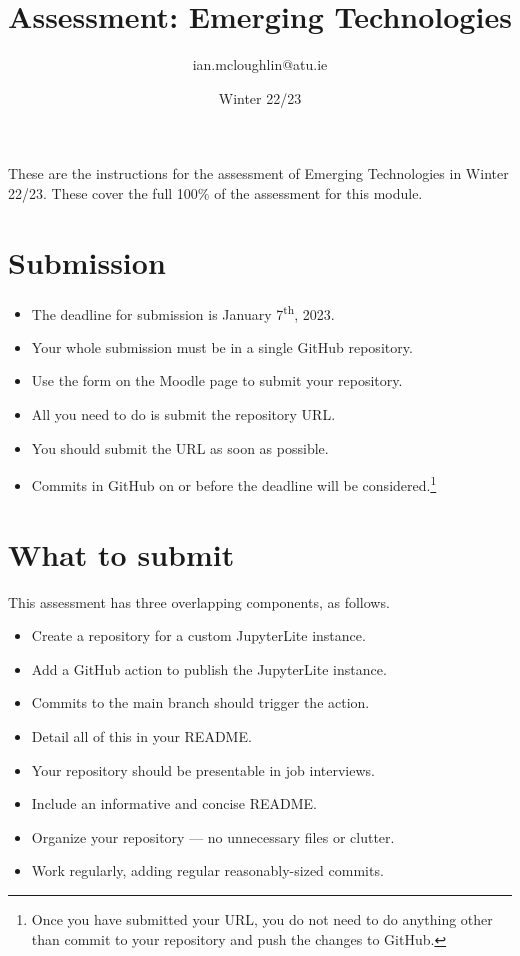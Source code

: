 \documentclass[a4paper]{tufte-handout}
\title{Assessment: Emerging Technologies}
\author{ian.mcloughlin@atu.ie}
\date{Winter 22/23}
\begin{document}
 
\maketitle

These are the instructions for the assessment of Emerging Technologies in Winter 22/23.
These cover the full 100\% of the assessment for this module.


\section{Submission}

\begin{itemize}
  \item The deadline for submission is January 7\textsuperscript{th}, 2023. 
  \item Your whole submission must be in a single GitHub repository.
  \item Use the form on the Moodle page to submit your repository.
  \item All you need to do is submit the repository URL.
  \item You should submit the URL as soon as possible.
  \item Commits in GitHub on or before the deadline will be considered.\footnote{Once you have submitted your URL, you do not need to do anything other than commit to your repository and push the changes to GitHub.}
\end{itemize}


\section{What to submit}
This assessment has three overlapping components, as follows.

\begin{itemize}
  \item Create a repository for a custom JupyterLite instance.
  \item Add a GitHub action to publish the JupyterLite instance.
  \item Commits to the main branch should trigger the action.
  \item Detail all of this in your README.
\end{itemize}

\begin{itemize}
  \item Your repository should be presentable in job interviews.
  \item Include an informative and concise README.
  \item Organize your repository --- no unnecessary files or clutter.
  \item Work regularly, adding regular reasonably-sized commits.
\end{itemize}
\end{document}
